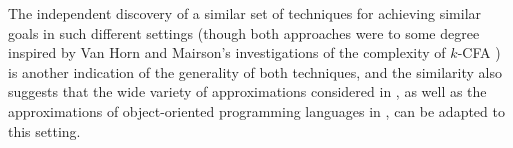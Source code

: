 The independent discovery of a similar set of techniques for achieving
similar goals in such different settings (though both approaches were
to some degree inspired by Van Horn and Mairson's investigations of
the complexity of $k$-CFA \cite{vanhorn07relating}) is another
indication of the generality of both techniques, and the similarity
also suggests that the wide variety of approximations considered in
\cite{might10abstracting}, as well as the approximations of
object-oriented programming languages in \cite{might10abstract}, can
be adapted to this setting.
